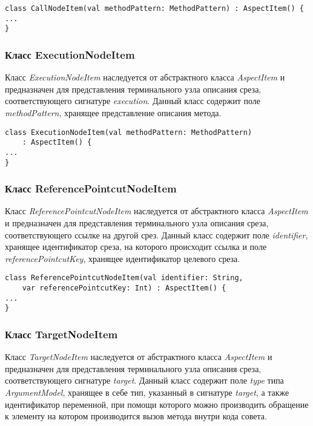 \begin{lstlisting}[style={java}, label={lst:CallNodeItem},
  caption={Класс CallNodeItem}]
class CallNodeItem(val methodPattern: MethodPattern) : AspectItem() {
...
}
\end{lstlisting}
\subsubsection{Класс ExecutionNodeItem}
\label{ssub:ExecutionNodeItem}
Класс \textit{ExecutionNodeItem} наследуется от абстрактного класса
\textit{AspectItem} и предназначен для представления терминального узла
описания среза, соответствующего сигнатуре \textit{execution}.
Данный класс содержит поле \textit{methodPattern}, хранящее представление
описания метода.

\begin{lstlisting}[style={java}, label={lst:ExecutionNodeItem},
  caption={Класс ExecutionNodeItem}]
class ExecutionNodeItem(val methodPattern: MethodPattern)
	: AspectItem() {
...
}
\end{lstlisting}
\subsubsection{Класс ReferencePointcutNodeItem}
\label{ssub:ReferencePointcutNodeItem}
Класс \textit{ReferencePointcutNodeItem} наследуется от абстрактного класса
\textit{AspectItem} и предназначен для представления терминального узла
описания среза, соответствующего ссылке на другой срез.
Данный класс содержит поле \textit{identifier}, хранящее идентификатор среза,
на которого происходит ссылка и поле \textit{referencePointcutKey}, хранящее
идентификатор целевого среза.

\begin{lstlisting}[style={java}, label={lst:ReferencePointcutNodeItem},
  caption={Класс ReferencePointcutNodeItem}]
class ReferencePointcutNodeItem(val identifier: String,
	var referencePointcutKey: Int) : AspectItem() {
...
}
\end{lstlisting}
\subsubsection{Класс TargetNodeItem}
\label{ssub:TargetNodeItem}
Класс \textit{TargetNodeItem} наследуется от абстрактного класса
\textit{AspectItem} и предназначен для представления терминального узла
описания среза, соответствующего сигнатуре \textit{target}.
Данный класс содержит поле \textit{type} типа \textit{ArgumentModel}, хранящее
в себе тип, указанный в сигнатуре \textit{target}, а также идентификатор
переменной, при помощи которого можно производить обращение к элементу на
котором производится вызов метода внутри кода совета.

